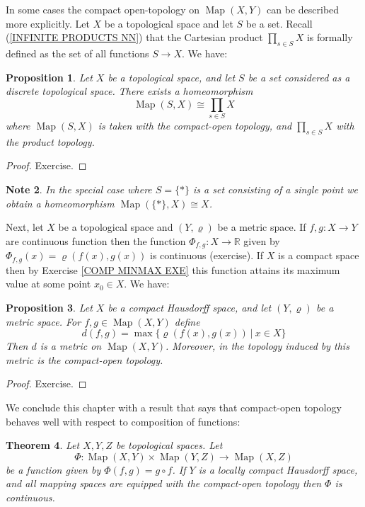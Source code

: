 \documentclass[11pt, letterpaper, oneside]{report}
\theoremstyle{pplain}
\newtheorem{theorem}{Theorem}[chapter]
\newtheorem{proposition}[theorem]{Proposition}
\newtheorem{ITERMVALUE THM}[theorem]{Intermediate Value Theorem}
\newtheorem{HEINEBOREL THM}[theorem]{Heine-Borel Theorem}
\newtheorem{UMETR THM}[theorem]{Urysohn Metrization Theorem}
\newtheorem{UMETR2 THM}[theorem]{Urysohn Metrization Theorem (v.2)}
\theoremstyle{ddefinition}
\newtheorem{note}[theorem]{Note}
\theoremstyle{nnn}
\newtheorem{TDA NN}[theorem]{Topological Data Analysis. }
\theoremstyle{eexercise}
\newcommand{\R}{{\mathbb R}}
\newcommand{\Map}{\operatorname{Map}}
\begin{document}
In some cases the compact open-topology on $\Map(X, Y)$ can be described more explicitly. 
Let $X$ be a topological space and let $S$ be a set. Recall (\ref{INFINITE PRODUCTS NN})
that the Cartesian product $\prod_{s\in S} X$ is formally defined as the set of all functions 
$S \to X$.  We have: 

\begin{proposition}
\label{CO TOP VS PROD TOP PROP}
Let $X$ be a topological space, and let $S$ be a set considered as a discrete topological space. 
There exists a homeomorphism
$$\Map(S, X)\cong \prod_{s\in S} X$$
where $\Map(S, X)$ is taken with the compact-open topology, and $\prod_{s\in S} X$ with the product 
topology. 
\end{proposition}

\begin{proof}
Exercise.
\end{proof}

\begin{note}
In the special case where $S = \{\ast\}$ is a set consisting of a single point we obtain a homeomorphism
$\Map(\{\ast\}, X) \cong X$. 
\end{note}


Next, let $X$ be a topological space and $(Y, \varrho)$ be a metric space. If $f, g\colon X \to Y$
are continuous function then the function $\Phi_{f, g}\colon X \to \R$ given by $\Phi_{f, g}(x) = \varrho(f(x), g(x))$
is continuous (exercise). If $X$ is a compact space then by Exercise \ref{COMP MINMAX EXE} this function
attains its maximum value at some point $x_{0}\in X$. We have: 

\begin{proposition}
\label{CO TOP TO COMP METRIC PROP}
Let $X$  be a compact Hausdorff space, and let $(Y, \varrho)$ be a metric space. For $f, g\in \Map(X, Y)$ define 
$$d(f, g) = \max\{\varrho(f(x), g(x)) \  |\  x\in X\}$$ 
Then $d$ is a metric on $\Map(X, Y)$. Moreover, in the topology induced by this metric is the compact-open topology. 
\end{proposition}

\begin{proof}
Exercise. 
\end{proof}

We conclude this chapter with a result that says that compact-open topology behaves well with respect to 
composition of functions:

\begin{theorem}
\label{CO TOP COMPOSITION CONT THM}
Let $X, Y, Z$ be topological spaces. Let 
$$\Phi\colon \Map(X, Y)\times \Map(Y, Z) \to \Map(X, Z)$$
be a function given by $\Phi(f, g) = g\circ f$. If $Y$ is a locally compact Hausdorff space, and all mapping spaces 
are equipped with the compact-open topology then $\Phi$ is continuous. 
\end{theorem}
\end{document}
